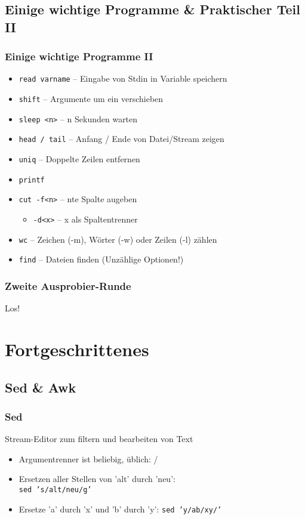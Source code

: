 \documentclass{beamer}
\begin{document}
\subsection{Einige wichtige Programme \& Praktischer Teil II}
\begin{frame}
 \frametitle{Einige wichtige Programme II}
 \begin{itemize}
  \item {\tt read varname} -- Eingabe von Stdin in Variable speichern
  \item {\tt shift} -- Argumente um ein verschieben
  \item {\tt sleep <n>} -- n Sekunden warten
  \item {\tt head / tail} -- Anfang / Ende von Datei/Stream zeigen
  \item {\tt uniq} -- Doppelte Zeilen entfernen
  \item {\tt printf}
  \item {\tt cut -f<n>} -- nte Spalte augeben
   \begin{itemize}
    \item {\tt -d<x>} -- x als Spaltentrenner
   \end{itemize}
  \item {\tt wc} -- Zeichen (-m), Wörter (-w) oder Zeilen (-l) zählen
  \item {\tt find} -- Dateien finden (Unzählige Optionen!)
 \end{itemize}
\end{frame}

\begin{frame}
 \frametitle{Zweite Ausprobier-Runde}
 \begin{center}
 Los!
 \end{center}
\end{frame}

\section{Fortgeschrittenes}
\subsection{Sed \& Awk}
\begin{frame}
 \frametitle{Sed}
 Stream-Editor zum filtern und bearbeiten von Text
 
 \begin{itemize}
  \item Argumentrenner ist beliebig, üblich: /
  \item Ersetzen aller Stellen von 'alt' durch 'neu': \\ {\tt sed 's/alt/neu/g'}
  \item Ersetze 'a' durch 'x' und 'b' durch 'y': {\tt sed 'y/ab/xy/'}
 \end{itemize}
\end{frame}
\end{document}
